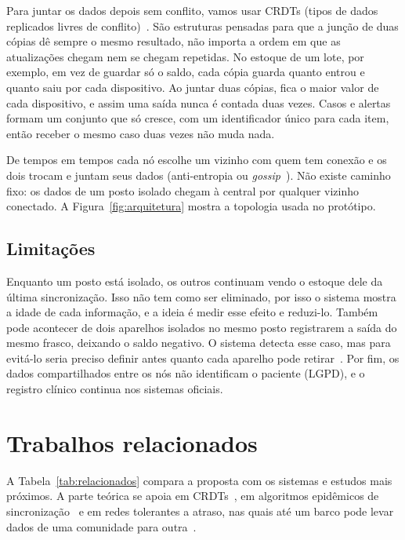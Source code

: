 \documentclass[a4paper,12pt]{article}
\begin{document}
Para juntar os dados depois sem conflito, vamos usar CRDTs (tipos de dados
replicados livres de conflito)~\cite{shapiro2011}. São estruturas pensadas
para que a junção de duas cópias dê sempre o mesmo resultado, não importa a
ordem em que as atualizações chegam nem se chegam repetidas. No estoque de um
lote, por exemplo, em vez de guardar só o saldo, cada cópia guarda quanto
entrou e quanto saiu por cada dispositivo. Ao juntar duas cópias, fica o maior
valor de cada dispositivo, e assim uma saída nunca é contada duas vezes. Casos
e alertas formam um conjunto que só cresce, com um identificador único para
cada item, então receber o mesmo caso duas vezes não muda nada.

De tempos em tempos cada nó escolhe um vizinho com quem tem conexão e os dois
trocam e juntam seus dados (anti-entropia ou \emph{gossip}~\cite{demers1987}).
Não existe caminho fixo: os dados de um posto isolado chegam à central por
qualquer vizinho conectado. A Figura~\ref{fig:arquitetura} mostra a topologia
usada no protótipo.

\subsection{Limitações}

Enquanto um posto está isolado, os outros continuam vendo o estoque dele da
última sincronização. Isso não tem como ser eliminado, por isso o sistema
mostra a idade de cada informação, e a ideia é medir esse efeito e
reduzi-lo. Também pode acontecer de dois aparelhos isolados no mesmo posto
registrarem a saída do mesmo frasco, deixando o saldo negativo. O sistema
detecta esse caso, mas para evitá-lo seria preciso definir antes quanto cada
aparelho pode retirar~\cite{balegas2015}. Por fim, os dados compartilhados
entre os nós não identificam o paciente (LGPD), e o registro clínico continua
nos sistemas oficiais.

\section{Trabalhos relacionados}
\label{sec:relacionados}

A Tabela~\ref{tab:relacionados} compara a proposta com os sistemas e estudos
mais próximos. A parte teórica se apoia em CRDTs~\cite{shapiro2011}, em
algoritmos epidêmicos de sincronização~\cite{demers1987} e em redes
tolerantes a atraso, nas quais até um barco pode levar dados de uma comunidade
para outra~\cite{pentland2004}.
\end{document}

